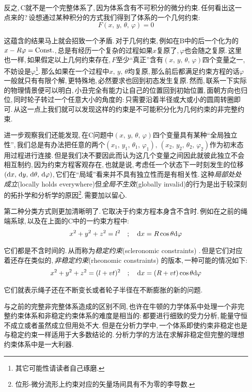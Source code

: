 反之,\,C就不是一个完整体系了,\,因为体系含有不可积分的微分约束.\,任何看出这一点来的?\,设想通过某种积分的方式我们得到了体系的一个几何约束:
\[F(x,\,y,\,\theta,\,\varphi)=0\]

这蕴含的结果马上就会招致一个矛盾.\,对于几何约束,\,例如在B中的后一个化为的$x-R\varphi={\rm Const.}$,\,总是有经历一个复杂的过程如果$x$复原了,\,$\varphi$也会随之复原.\,这里也一样,\,如果假定以上几何约束存在,\,$F$至少``真正''含有$(x,\,y,\,\theta,\,\varphi)$四个变量之一,\,不妨设是$\varphi$\footnote{其它可能性请读者自己琢磨.}.\,那么如果在一个过程中$x,\,y,\,\theta$均复原,\,那么前后都满足约束方程的话$\varphi$一般就只有有限个解,\,更特殊地,\,必然要求也回到初态发生复原.\,然而,\,联系一下实际的物理情景便可以明白,\,小丑完全有能力让自己的位置回到初始位置,\,面朝方向也归位,\,同时轮子转过一个任意大小的角度的:\,只需要沿着半径或大或小的圆周转圈即可.\,从这一点上我们就可以发现这样的约束是不可能积分化为几何约束的非完整约束.

进一步观察我们还能发现,\,在C问题中$(x,\,y,\,\theta,\,\varphi)$四个变量具有某种``全局独立性'',\,我们总是有办法把任意的两个$(x_1,\,y_1,\,\theta_1,\,\varphi_1),\,(x_2,\,y_2,\,\theta_2,\,\varphi_2)$作为初末态用过程进行连接.\,但是我们决不要因此而认为这几个变量之间因此就彼此独立不会相互制约,\,因为约束方程客观存在,\,也就是说,\,考虑任一个状态下一时刻发生的位移$(\textrm{d} x,\,\textrm{d} y,\,\textrm{d} \theta,\,\textrm{d} \varphi)$,\,它们在``局域''看来并不具有独立性而是有相关性.\,这种\emph{局部处处成立}(locally holds everywhere)但\emph{全局不生效}(globally invalid)的行为是出于较深刻的拓扑学和分析学的原因\footnote{位形-微分流形上约束对应的矢量场间具有不为零的李导数.}.\,需要加以留心.

第二种分类方式则更加清晰明了.\,它取决于约束方程本身含不含时.\,例如在之前的绳端系球,\,以及在上面的C中的一约束方程中:
\[x^2+y^2+z^2=l^2 \quad;\quad \textrm{d} x=R\cos\theta\textrm{d} \varphi\]

它们都是不含时间的.\,从而称为\emph{稳定约束}(scleronomic constraints)%
.\,但是它们对应着还存在类似的,\,\emph{非稳定约束}(rheonomic constraints)%
的版本,\,一种可能的情况如下:
\[x^2+y^2+z^2=(l+vt)^2 \quad;\quad \textrm{d} x=(R+vt)\cos\theta\textrm{d} \varphi\]

它们就表示绳子还在不断变长或者轮子半径在不断膨胀的新的问题.

与之前的完整非完整体系造成的区别不同,\,也许在牛顿的力学体系中处理一个非完整约束体系和非稳定约束体系的难度是相当的:\,都要进行细致的受力分析,\,能量守恒不成立或者虽然成立但用处不大.\,但是在分析力学中,\,一个体系即使约束非稳定也是与稳定约束一样适用于大多数结论的.\,分析力学的方法在求解非稳定但完整的理想约束体系中是一大利器.

